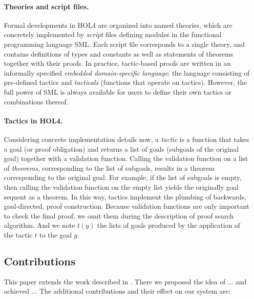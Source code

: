 \documentclass[runningheads,a4paper,draft]{svjour3}
\def\holfour{\textsf{HOL4}\xspace}
\def\sml{\textsf{SML}\xspace}
\begin{document}
\paragraph{Theories and script files.}
Formal developments in \holfour are organized into named theories, which are concretely implemented by \emph{script} files defining modules in the functional programming language \sml.
Each script file corresponds to a single theory, and contains definitions of types and constants as well as statements of theorems together with their proofs.
In practice, tactic-based proofs are written in an informally specified \emph{embedded domain-specific language}: the language consisting of pre-defined tactics and \emph{tacticals} (functions that operate on tactics).
However, the full power of \sml is always available for users to define their own tactics or combinations thereof.

\paragraph{Tactics in \holfour.}
Considering concrete implementation details now, a \emph{tactic} is a function
that takes a goal (or proof obligation) and returns a list of goals (subgoals of the original goal) together
with a validation function.
Calling the validation function on a list of \emph{theorems}, corresponding to the list of subgoals, results in a theorem corresponding to the original goal.
For example, if the list of subgoals is empty, then calling the validation function on the empty list yields the originally goal sequent as a theorem.
In this way, tactics implement the plumbing of backwards, goal-directed, proof 
construction. 
Because validation functions are only important to check the final proof, we 
omit them during the description of proof search algorithm. And we note $t(g)$ 
the lists of goals produced by the application of the tactic $t$ to the goal 
$g$.

\subsection{Contributions}
This paper extends the work described in \cite{tgckju-lpar17}.
There we proposed the idea of ... and achieved ...
The additional contributions and their effect on our system are:
\end{document}
